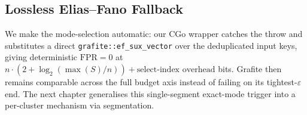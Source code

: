 \subsection{Lossless Elias--Fano Fallback}
\label{subsec:grafite-fallback}

We make the mode-selection automatic: our CGo wrapper catches the
throw and substitutes a direct \texttt{grafite::ef\_sux\_vector} over
the deduplicated input keys, giving deterministic $\mathrm{FPR} = 0$
at $n \cdot (2 + \log_2(\max(S)/n)) + \text{select-index overhead}$
bits. Grafite then remains comparable across the full budget axis
instead of failing on its tightest-$\varepsilon$ end. The next chapter
generalises this single-segment exact-mode trigger into a per-cluster
mechanism via segmentation.
